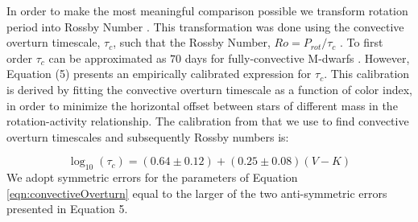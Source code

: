 
In order to make the most meaningful comparison possible we transform rotation
period into Rossby Number . This transformation was done using the convective
overturn timescale, $\tau_{c}$, such that the Rossby Number, $Ro =
P_{rot}/\tau_{c}$ . To first order $\tau_{c}$ can be approximated as $70$ days
for fully-convective M-dwarfs \citep{Pizzolato2000}. However, \citet{Wri18}
Equation (5) presents an empirically calibrated expression for $\tau_{c}$. This
calibration is derived by fitting the convective overturn timescale as a
function of color index, in order to minimize the horizontal offset between
stars of different mass in the rotation-activity relationship.  The calibration
from \citet{Wri18} that we use to find convective overturn timescales and
subsequently Rossby numbers is:

\begin{equation}\label{eqn:convectiveOverturn}
    \log_{10}(\tau_{c}) = (0.64\pm0.12)+(0.25\pm0.08)(V-K)
\end{equation}
We adopt symmetric errors for the parameters of Equation
\ref{eqn:convectiveOverturn} equal to the larger of the two anti-symmetric
errors presented in \citet{Wri18} Equation 5. 
